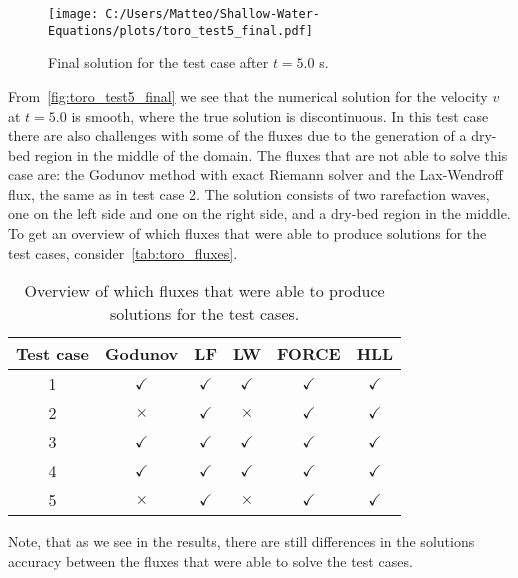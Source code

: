 \begin{figure}[H]
    \centering
    \texttt{[image: C:/Users/Matteo/Shallow-Water-Equations/plots/toro\_test5\_final.pdf]}
    \caption{Final solution for the test case after $t = 5.0$ s.}\label{fig:toro_test5_final}
\end{figure}
From~\autoref{fig:toro_test5_final} we see that the numerical solution for the velocity $v$ at $t=5.0$ is smooth, where the true solution is discontinuous. 
In this test case there are also challenges with some of the fluxes due to the generation of a dry-bed region in the middle of the domain.
The fluxes that are not able to solve this case are: the Godunov method with exact Riemann solver and the Lax-Wendroff flux, the same as in test case 2.
The solution consists of two rarefaction waves, one on the left side and one on the right side, and a dry-bed region in the middle.
To get an overview of which fluxes that were able to produce solutions for the test cases, consider~\autoref{tab:toro_fluxes}.
\begin{table}[H]
    \centering
    \begin{tabular}{c|c|c|c|c|c}
        \hline
        \textbf{Test case} & \textbf{Godunov} & \textbf{LF} & \textbf{LW} & \textbf{FORCE} & \textbf{HLL}   \\
        \hline\hline
        1 & $\checkmark$ & $\checkmark$ & $\checkmark$ & $\checkmark$ & $\checkmark$   \\
        2 & $\times$ & $\checkmark$ & $\times$ & $\checkmark$ & $\checkmark$ \\
        3 & $\checkmark$ & $\checkmark$ & $\checkmark$ & $\checkmark$ & $\checkmark$  \\
        4 & $\checkmark$ & $\checkmark$ & $\checkmark$ & $\checkmark$ & $\checkmark$  \\
        5 & $\times$ & $\checkmark$ & $\times$ & $\checkmark$ & $\checkmark$  \\
        \hline
    \end{tabular}
    \caption{Overview of which fluxes that were able to produce solutions for the test cases.}\label{tab:toro_fluxes}
\end{table}
Note, that as we see in the results, there are still differences in the solutions accuracy between the fluxes that were able to solve the test cases.
 

